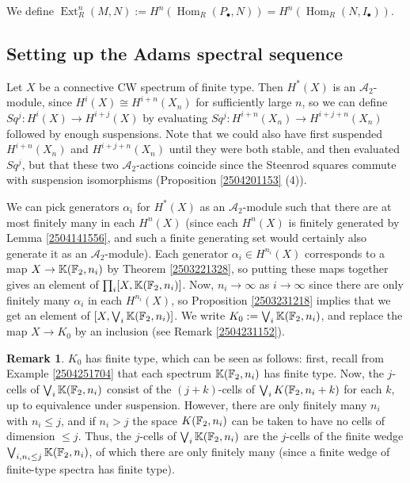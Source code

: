 \documentclass[11pt, titlepage]{article} %
\def\bb{\ensuremath\mathbb}
\def\A{\ensuremath{\mathscr{A}_2}}
\DeclareMathOperator{\Ext}{Ext}
\DeclareMathOperator{\Hom}{Hom}
\def\textcolour{\textcolor}
\numberwithin{equation}{subsection}
\theoremstyle{plain}
\theoremstyle{definition}
\newtheorem{remark}[theorem]{Remark}
\begin{document}
We define \(\Ext^{n}_R(M,N):=H^n(\Hom_R(P_\bullet, N))=H^n(\Hom_R(N, I_\bullet))\). 

\subsection{Setting up the Adams spectral sequence}\label{2504291248}

Let \(X\) be a connective CW spectrum of finite type. Then \(H^*(X)\) is an \(\A\)-module, since \(H^i(X)\cong H^{i+n}(X_n)\) for sufficiently large \(n\), so we can define \(Sq^j : H^i(X)\to H^{i+j}(X)\) by evaluating \(Sq^j : H^{i+n}(X_n)\to H^{i+j+n}(X_n)\) followed by enough suspensions. Note that we could also have first suspended \(H^{i+n}(X_n)\) and \(H^{i+j+n}(X_n)\) until they were both stable, and then evaluated \(Sq^j\), but that these two \(\A\)-actions coincide since the Steenrod squares commute with suspension isomorphisms (Proposition \ref{2504201153} (4)). %

We can pick generators \(\alpha_i\) for \(H^*(X)\) as an \(\mathscr{A}_2\)-module such that there are at most finitely many in each \(H^n(X)\) (since each \(H^n(X)\) is finitely generated by Lemma  \ref{2504141556}, and such a finite generating set would certainly also generate it as an \(\A\)-module). Each generator \(\alpha_i\in H^{n_i}(X)\) corresponds to a map \(X \to \bb{K}(\bb{F}_2, n_i)\) by Theorem \ref{2503221328}, so putting these maps together gives an element of \(\prod_i [X, \bb{K}(\bb{F}_2, n_i)]\). Now, \(n_i \to\infty\) as \(i\to \infty\) since there are only finitely many \(\alpha_i\) in each \(H^{n_i}(X)\), so Proposition \ref{2503231218} implies that we get an element of \([X, \bigvee_i \bb{K}(\bb{F}_2, n_i)]\).  We write \(K_0 := \bigvee_i \bb{K}(\bb{F}_2, n_i)\), and replace the map \(X \to K_0\) by an inclusion (see Remark \ref{2504231152}).

\begin{remark}
\(K_0\) has finite type, which can be seen as follows: first, recall from Example \ref{2504251704} that each spectrum \(\bb{K}(\bb{F}_2, n_i)\) has finite type. Now, the \(j\)-cells of \(\bigvee_i \bb{K}(\bb{F}_2, n_i)\) consist of the \((j+k)\)-cells of \(\bigvee_i K(\bb{F}_2, n_i+k)\) for each \(k\), up to equivalence under suspension. However, there are only finitely many \(n_i\) with \(n_i\leq j\), and if \(n_i>j\) the space \(K(\bb{F}_2, n_i)\) can be taken to have no cells of dimension \(\leq j\). Thus, the \(j\)-cells of \(\bigvee_i \bb{K}(\bb{F}_2, n_i)\) are the \(j\)-cells of the finite wedge \(\bigvee_{i, n_i\leq j}\bb{K}(\bb{F}_2, n_i)\), of which there are only finitely many (since a finite wedge of finite-type spectra has finite type). 
\end{remark}
\end{document}
